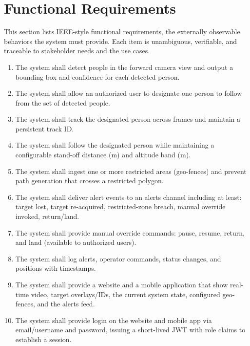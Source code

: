 \documentclass[12pt,a4paper]{report}
\begin{document}
\section{Functional Requirements}
\noindent
This section lists IEEE-style functional requirements, the externally observable behaviors the system must provide. Each item is unambiguous, verifiable, and traceable to stakeholder needs and the use cases.


\begin{enumerate}[label=\textbf{FR\arabic*}, leftmargin=*]

\item The system shall detect people in the forward camera view and output a bounding box and confidence for each detected person.

\item The system shall allow an authorized user to designate one person to follow from the set of detected people.

\item The system shall track the designated person across frames and maintain a persistent track ID.

\item The system shall follow the designated person while maintaining a configurable stand-off distance (m) and altitude band (m).

\item The system shall ingest one or more restricted areas (geo-fences) and prevent path generation that crosses a restricted polygon.

\item The system shall deliver alert events to an alerts channel including at least: target lost, target re-acquired, restricted-zone breach, manual override invoked, return/land.

\item The system shall provide manual override commands: pause, resume, return, and land (available to authorized users).

\item The system shall log alerts, operator commands, status changes, and positions with timestamps.

\item The system shall provide a website and a mobile application that show real-time video, target overlays/IDs, the current system state, configured geo-fences, and the alerts feed.

\item The system shall provide login on the website and mobile app via email/username and password, issuing a short-lived \ac{JWT} with role claims to establish a session.



\end{enumerate}
\end{document}

